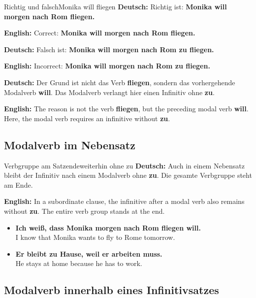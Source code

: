 \documentclass[a4paper,11pt]{article}
\newcommand{\GermanText}[1]{\textbf{Deutsch: }#1\par}
\newcommand{\EnglishText}[1]{{\small\color{SoftGray}\textbf{English: }#1\par}}
\newcommand{\ExampleItem}[2]{\item \textbf{#1}\\{\small\color{SoftGray}#2}}
\begin{document}
        \begin{grammarentry}{Richtig und falsch}{Monika will fliegen}
            \GermanText{Richtig ist: \textbf{Monika will morgen nach Rom fliegen.}}
            \EnglishText{Correct: \textbf{Monika will morgen nach Rom fliegen.}}

            \GermanText{Falsch ist: \textbf{Monika will morgen nach Rom zu fliegen.}}
            \EnglishText{Incorrect: \textbf{Monika will morgen nach Rom zu fliegen.}}

            \GermanText{Der Grund ist nicht das Verb \textbf{fliegen}, sondern das vorhergehende Modalverb \textbf{will}. Das Modalverb verlangt hier einen Infinitiv ohne \textbf{zu}.}
            \EnglishText{The reason is not the verb \textbf{fliegen}, but the preceding modal verb \textbf{will}. Here, the modal verb requires an infinitive without \textbf{zu}.}
        \end{grammarentry}

        \subsection{Modalverb im Nebensatz}

            \begin{grammarentry}{Verbgruppe am Satzende}{weiterhin ohne zu}
                \GermanText{Auch in einem Nebensatz bleibt der Infinitiv nach einem Modalverb ohne \textbf{zu}. Die gesamte Verbgruppe steht am Ende.}
                \EnglishText{In a subordinate clause, the infinitive after a modal verb also remains without \textbf{zu}. The entire verb group stands at the end.}
            \end{grammarentry}

            \begin{exbox}
                \begin{itemize}
                    \ExampleItem{Ich weiß, dass Monika morgen nach Rom fliegen will.}{I know that Monika wants to fly to Rome tomorrow.}
                    \ExampleItem{Er bleibt zu Hause, weil er arbeiten muss.}{He stays at home because he has to work.}
                \end{itemize}
            \end{exbox}

        \subsection{Modalverb innerhalb eines Infinitivsatzes}
\end{document}
